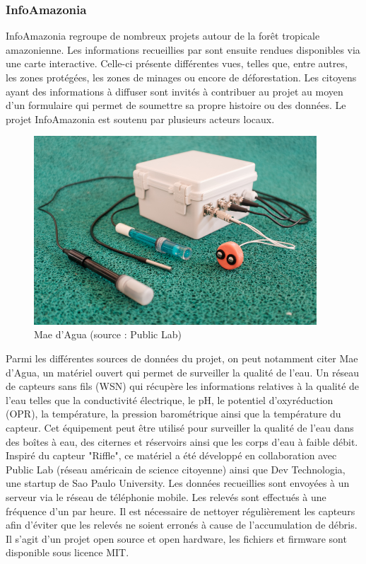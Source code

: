 \documentclass[10pt, conference, compsocconf]{llncs}
\begin{document}
		\subsubsection{InfoAmazonia}
			InfoAmazonia regroupe de nombreux projets autour de la forêt tropicale amazonienne. Les informations recueillies par sont ensuite rendues disponibles via une carte interactive. Celle-ci présente différentes vues, telles que, entre autres, les zones protégées, les zones de minages ou encore de déforestation. Les citoyens ayant des informations à diffuser sont invités à contribuer au projet au moyen d'un formulaire qui permet de soumettre sa propre histoire ou des données. Le projet InfoAmazonia est soutenu par plusieurs acteurs locaux. \\
			\begin{figure}
				\begin{center}
					\includegraphics[width=300pt]{mae-dagua.jpg}
				\end{center}
				\caption{Mae d'Agua (source : Public Lab)}
			\end{figure}
			Parmi les différentes sources de données du projet, on peut notamment citer Mae d'Agua, un matériel ouvert qui permet de surveiller la qualité de l'eau. Un réseau de capteurs sans fils (WSN) qui récupère les informations relatives à la qualité de l'eau telles que la conductivité électrique, le pH, le potentiel d'oxyréduction (OPR), la température, la pression barométrique ainsi que la température du capteur. Cet équipement peut être utilisé pour surveiller la qualité de l'eau dans des boîtes à eau, des citernes et réservoirs ainsi que les corps d'eau à faible débit. Inspiré du capteur "Riffle", ce matériel a été développé en collaboration avec Public Lab (réseau américain de science citoyenne) ainsi que Dev Technologia, une startup de Sao Paulo University. Les données recueillies sont envoyées à un serveur via le réseau de téléphonie mobile. Les relevés sont effectués à une fréquence d'un par heure. Il est nécessaire de nettoyer régulièrement les capteurs afin d'éviter que les relevés ne soient erronés à cause de l'accumulation de débris. Il s'agit d'un projet open source et open hardware, les fichiers et firmware sont disponible sous licence MIT. \\
\end{document}
